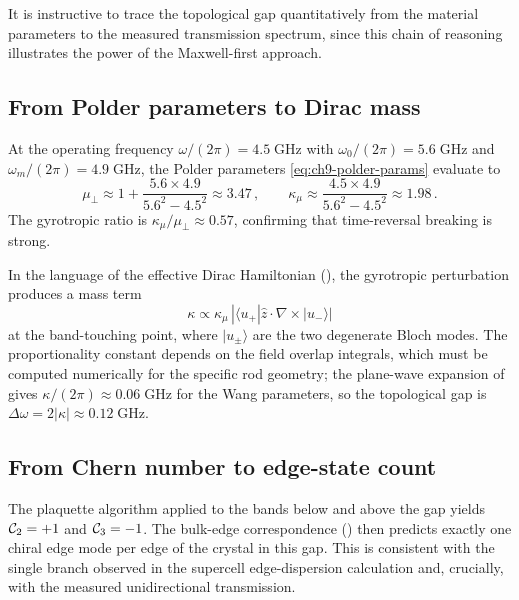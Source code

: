 It is instructive to trace the topological gap quantitatively from the
material parameters to the measured transmission spectrum, since this
chain of reasoning illustrates the power of the Maxwell-first approach.

\subsection{From Polder parameters to Dirac mass}
\label{sec:ch9-polder-to-mass}

At the operating frequency $\omega/(2\pi)=4.5\;\mathrm{GHz}$ with
$\omega_0/(2\pi)=5.6\;\mathrm{GHz}$ and
$\omega_m/(2\pi)=4.9\;\mathrm{GHz}$, the Polder parameters
\eqref{eq:ch9-polder-params} evaluate to
\begin{equation}\label{eq:ch9-polder-numerical}
  \mu_\perp \approx 1+\frac{5.6\times4.9}{5.6^2-4.5^2}
  \approx 3.47\,,
  \qquad
  \kappa_\mu \approx \frac{4.5\times4.9}{5.6^2-4.5^2}
  \approx 1.98\,.
\end{equation}
The gyrotropic ratio is $\kappa_\mu/\mu_\perp\approx 0.57$,
confirming that time-reversal breaking is strong.

In the language of the effective Dirac Hamiltonian
(), the gyrotropic perturbation produces a mass
term
\begin{equation}\label{eq:ch9-mass-estimate}
  \kappa
  \propto \kappa_\mu\,|\langle u_+|\hat{z}\cdot\nabla\times|u_-\rangle|
\end{equation}
at the band-touching point, where $|u_\pm\rangle$ are the two
degenerate Bloch modes.  The proportionality constant depends on the
field overlap integrals, which must be computed numerically for the
specific rod geometry; the plane-wave expansion of
 gives $\kappa/(2\pi)\approx 0.06\;\mathrm{GHz}$
for the Wang parameters, so the topological gap is
$\Delta\omega=2|\kappa|\approx 0.12\;\mathrm{GHz}$.

\subsection{From Chern number to edge-state count}
\label{sec:ch9-chern-to-edge}

The plaquette algorithm applied to the bands below and above the gap
yields $\mathcal{C}_2=+1$ and $\mathcal{C}_3=-1$.
The bulk-edge correspondence () then
predicts exactly one chiral edge mode per edge of the crystal in this
gap.  This is consistent with the single branch observed in the
supercell edge-dispersion calculation and, crucially, with the
measured unidirectional transmission.

